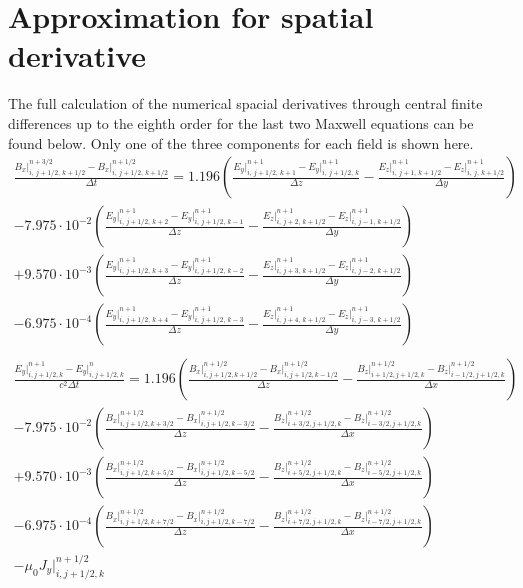 \documentclass[bachelor_thesis]{subfiles}
\begin{document}
\appendix
\chapter{Approximation for spatial derivative} \label{chap:numMaxwell}

The full calculation of the numerical spacial derivatives through central finite differences up to the eighth order for the last two Maxwell equations can be found below.
Only one of the three components for each field is shown here.
\begin{align*}
\frac{{B}_x\rvert_{i,\, j+1/2,\, k+1/2}^{n+3/2} - {B}_x\rvert_{i,\, j+1/2,\, k+1/2}^{n+1/2}}{\Delta t}
	= 1.196 \left(\frac{{E}_y\rvert_{i,\, j+1/2,\, k+1}^{n+1} - {E}_y\rvert_{i,\, j+1/2,\, k}^{n+1}}{\Delta z}
	- \frac{{E}_z\rvert_{i,\, j+1,\, k+1/2}^{n+1} - {E}_z\rvert_{i,\, j,\, k+1/2}^{n+1}}{\Delta y}\right)			\\
	- 7.975\cdot 10^{-2} \left(\frac{{E}_y\rvert_{i,\, j+1/2,\, k+2}^{n+1} - {E}_y\rvert_{i,\, j+1/2,\, k-1}^{n+1}}{\Delta z}
	- \frac{{E}_z\rvert_{i,\, j+2,\, k+1/2}^{n+1} - {E}_z\rvert_{i,\, j-1,\, k+1/2}^{n+1}}{\Delta y}\right)			\\
	+ 9.570\cdot 10^{-3} \left(\frac{{E}_y\rvert_{i,\, j+1/2,\, k+3}^{n+1} - {E}_y\rvert_{i,\, j+1/2,\, k-2}^{n+1}}{\Delta z}
	- \frac{{E}_z\rvert_{i,\, j+3,\, k+1/2}^{n+1} - {E}_z\rvert_{i,\, j-2,\, k+1/2}^{n+1}}{\Delta y}\right)			\\
	- 6.975\cdot 10^{-4} \left(\frac{{E}_y\rvert_{i,\, j+1/2,\, k+4}^{n+1} - {E}_y\rvert_{i,\, j+1/2,\, k-3}^{n+1}}{\Delta z}
	- \frac{{E}_z\rvert_{i,\, j+4,\, k+1/2}^{n+1} - {E}_z\rvert_{i,\, j-3,\, k+1/2}^{n+1}}{\Delta y}\right)			\\ \\
\frac{E_y\rvert_{i, j+1/2, k}^{n+1} - E_y\rvert_{i, j+1/2, k}^{n}}{c^2 \Delta t} 
	= 1.196 \left(\frac{B_x\rvert_{i, j+1/2, k+1/2}^{n+1/2} - B_x\rvert_{i, j+1/2, k-1/2}^{n+1/2}}{\Delta z}
	 - \frac{B_z\rvert_{i+1/2, j+1/2, k}^{n+1/2} - B_z\rvert_{i-1/2, j+1/2, k}^{n+1/2}}{\Delta x}\right)			\\
 	- 7.975\cdot 10^{-2} \left(\frac{B_x\rvert_{i, j+1/2, k+3/2}^{n+1/2} - B_x\rvert_{i, j+1/2, k-3/2}^{n+1/2}}{\Delta z}
 	 -\frac{B_z\rvert_{i+3/2, j+1/2, k}^{n+1/2} - B_z\rvert_{i-3/2, j+1/2, k}^{n+1/2}}{\Delta x}\right)			\\
 	+ 9.570\cdot 10^{-3} \left(\frac{B_x\rvert_{i, j+1/2, k+5/2}^{n+1/2} - B_x\rvert_{i, j+1/2, k-5/2}^{n+1/2}}{\Delta z}
 	- \frac{B_z\rvert_{i+5/2, j+1/2, k}^{n+1/2} - B_z\rvert_{i-5/2, j+1/2, k}^{n+1/2}}{\Delta x}\right)			\\
 	- 6.975\cdot 10^{-4} \left(\frac{B_x\rvert_{i, j+1/2, k+7/2}^{n+1/2} - B_x\rvert_{i, j+1/2, k-7/2}^{n+1/2}}{\Delta z}
	-\frac{B_z\rvert_{i+7/2, j+1/2, k}^{n+1/2} - B_z\rvert_{i-7/2, j+1/2, k}^{n+1/2}}{\Delta x}\right)			\\
 	- \mu_0 J_y\rvert_{i, j+1/2, k}^{n+1/2}
\end{align*}
\end{document}
